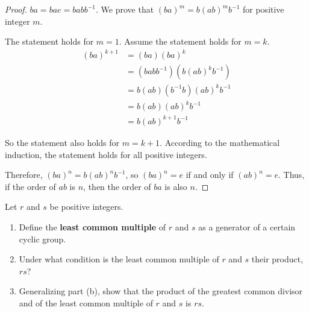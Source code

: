 \begin{proof}
    $ba = bae = babb^{-1}$. We prove that ${(ba)}^{m} = b{(ab)}^{m}b^{-1}$ for positive integer $m$.

    The statement holds for $m = 1$. Assume the statement holds for $m = k$.
    \begin{align*}
        {(ba)}^{k+1} & = (ba){(ba)}^{k}                 \\
                     & = (babb^{-1})(b{(ab)}^{k}b^{-1}) \\
                     & = b(ab)(b^{-1}b){(ab)}^{k}b^{-1} \\
                     & = b(ab){(ab)}^{k}b^{-1}          \\
                     & = b{(ab)}^{k+1}b^{-1}
    \end{align*}

    So the statement also holds for $m = k + 1$. According to the mathematical induction, the statement holds for all positive integers.

    Therefore, ${(ba)}^{n} = b{(ab)}^{n}b^{-1}$, so ${(ba)}^{n} = e$ if and only if ${(ab)}^{n} = e$. Thus, if the order of $ab$ is $n$, then the order of $ba$ is also $n$.
\end{proof}

\newpage
\begin{exercise}
    Let $r$ and $s$ be positive integers.
    \begin{enumerate}[label={\textbf{\alph*.}}]
        \item Define the \textbf{least common multiple} of $r$ and $s$ as a generator of a certain cyclic group.
        \item Under what condition is the least common multiple of $r$ and $s$ their product, $rs$?
        \item Generalizing part (b), show that the product of the greatest common divisor and of the least common multiple of $r$ and $s$ is $rs$.
    \end{enumerate}
\end{exercise}

